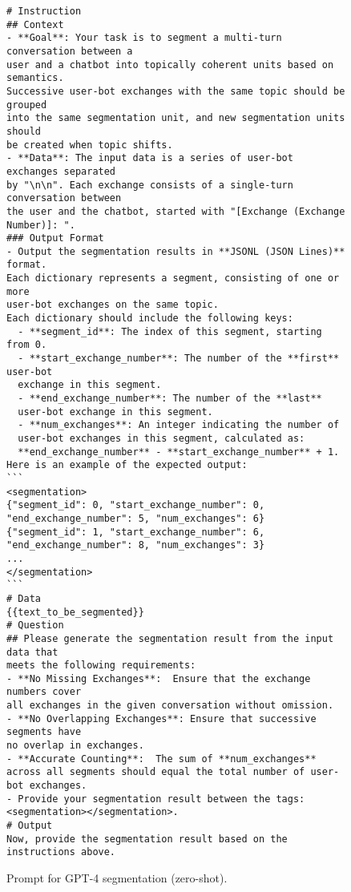 \begin{figure}[htb]
\small
\begin{tcolorbox}[left=3pt,right=3pt,top=3pt,bottom=3pt,title=Instruction Part of the Segmentation Prompt (Zero-Shot).]
\begin{verbatim}
# Instruction
## Context
- **Goal**: Your task is to segment a multi-turn conversation between a 
user and a chatbot into topically coherent units based on semantics. 
Successive user-bot exchanges with the same topic should be grouped 
into the same segmentation unit, and new segmentation units should 
be created when topic shifts.
- **Data**: The input data is a series of user-bot exchanges separated 
by "\n\n". Each exchange consists of a single-turn conversation between 
the user and the chatbot, started with "[Exchange (Exchange Number)]: ".
### Output Format
- Output the segmentation results in **JSONL (JSON Lines)** format. 
Each dictionary represents a segment, consisting of one or more 
user-bot exchanges on the same topic. 
Each dictionary should include the following keys:
  - **segment_id**: The index of this segment, starting from 0.
  - **start_exchange_number**: The number of the **first** user-bot 
  exchange in this segment.
  - **end_exchange_number**: The number of the **last** 
  user-bot exchange in this segment.
  - **num_exchanges**: An integer indicating the number of 
  user-bot exchanges in this segment, calculated as:
  **end_exchange_number** - **start_exchange_number** + 1.
Here is an example of the expected output:
```
<segmentation>
{"segment_id": 0, "start_exchange_number": 0, 
"end_exchange_number": 5, "num_exchanges": 6}
{"segment_id": 1, "start_exchange_number": 6, 
"end_exchange_number": 8, "num_exchanges": 3}
...
</segmentation>
```
# Data
{{text_to_be_segmented}}
# Question
## Please generate the segmentation result from the input data that 
meets the following requirements:
- **No Missing Exchanges**:  Ensure that the exchange numbers cover 
all exchanges in the given conversation without omission. 
- **No Overlapping Exchanges**: Ensure that successive segments have 
no overlap in exchanges.
- **Accurate Counting**:  The sum of **num_exchanges**
across all segments should equal the total number of user-bot exchanges.
- Provide your segmentation result between the tags:
<segmentation></segmentation>.
# Output
Now, provide the segmentation result based on the instructions above.
\end{verbatim}
\end{tcolorbox}
\caption{Prompt for GPT-4 segmentation (zero-shot).}
\label{fig: prompt4seg-zero-shot}
\end{figure}